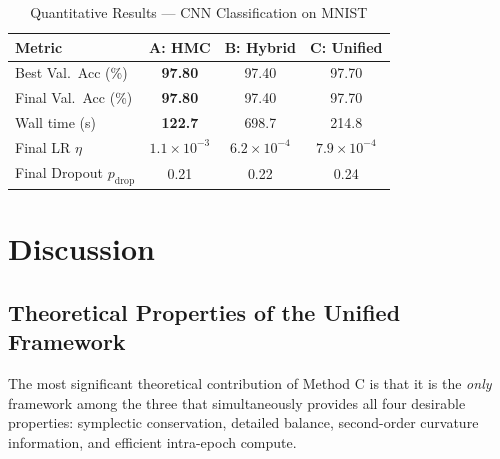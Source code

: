 \documentclass[12pt,a4paper]{article}
\begin{document}
\begin{table}[tb]
\centering
\caption{Quantitative Results --- CNN Classification on MNIST}
\label{tab:cnn_results}
\renewcommand{\arraystretch}{1.25}
\begin{tabular}{lccc}
\toprule
\textbf{Metric}     & \textbf{A: HMC} & \textbf{B: Hybrid} & \textbf{C: Unified} \\
\midrule
Best Val.\ Acc (\%) & \textbf{97.80} & 97.40 & 97.70 \\
Final Val.\ Acc (\%) & \textbf{97.80} & 97.40 & 97.70 \\
Wall time (s)       & \textbf{122.7}  & 698.7  & 214.8  \\
Final LR $\eta$     & $1.1\!\times\!10^{-3}$
                    & $6.2\!\times\!10^{-4}$
                    & $7.9\!\times\!10^{-4}$ \\
Final Dropout $p_{\mathrm{drop}}$ & 0.21 & 0.22 & 0.24 \\
\bottomrule
\end{tabular}
\end{table}




\section{Discussion}

\subsection{Theoretical Properties of the Unified Framework}

The most significant theoretical contribution of Method C is that it
is the \emph{only} framework among the three that simultaneously
provides all four desirable properties: symplectic conservation,
detailed balance, second-order curvature information, and efficient
intra-epoch compute.
\end{document}
